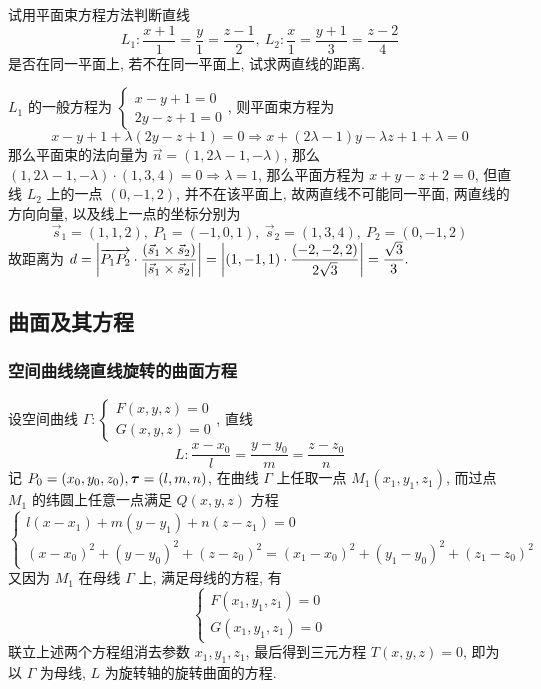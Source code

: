 \begin{example}
    试用平面束方程方法判断直线
    $$L_1:\dfrac{x+1}{1}=\dfrac{y}{1}=\dfrac{z-1}{2},~L_2:\dfrac{x}{1}=\dfrac{y+1}{3}=\dfrac{z-2}{4}$$
    是否在同一平面上, 若不在同一平面上, 试求两直线的距离.
\end{example}
\begin{solution}
    $L_1$ 的一般方程为 $\left\{\begin{matrix}
            x-y+1=0 \\
            2y-z+1=0
        \end{matrix}\right.$, 则平面束方程为 $$x-y+1+\lambda(2y-z+1)=0\Rightarrow x+(2\lambda-1)y-\lambda z+1+\lambda=0$$
    那么平面束的法向量为 $\vec{n}=(1,2\lambda-1,-\lambda)$, 那么 $(1,2\lambda-1,-\lambda)\cdot(1,3,4)=0\Rightarrow \lambda=1$, 
    那么平面方程为 $x+y-z+2=0$, 但直线 $L_2$ 上的一点 $(0,-1,2)$, 并不在该平面上, 故两直线不可能同一平面, 两直线的方向向量, 以及线上一点的坐标分别为
    $$\vec{s}_1=(1,1,2),~P_1=(-1,0,1),~\vec{s}_2=(1,3,4),~P_2=(0,-1,2)$$
    故距离为 $d=\qty|\overrightarrow{P_1P_2}\cdot\dfrac{\qty(\vec{s}_1\times\vec{s}_2)}{\qty|\vec{s}_1\times\vec{s}_2|}|=\qty|(1,-1,1)\cdot\dfrac{(-2,-2,2)}{2\sqrt{3}}|=\dfrac{\sqrt{3}}{3}.$
\end{solution}

\subsection{曲面及其方程}

\subsubsection{空间曲线绕直线旋转的曲面方程}

\begin{theorem}[空间曲线绕直线旋转的曲面方程]
    设空间曲线 $\Gamma:\begin{cases}
        F(x,y,z)=0\\
        G(x,y,z)=0
    \end{cases}$, 直线 $$L:\dfrac{x-x_0}{l}=\dfrac{y-y_0}{m}=\dfrac{z-z_0}{n}$$ 
    记 $P_0=(x_0,y_0,z_0),\vb*{\tau}=(l,m,n)$, 在曲线 $\Gamma$ 上任取一点 $M_1(x_1,y_1,z_1)$, 
    而过点 $M_1$ 的纬圆上任意一点满足 $Q(x,y,z)$ 方程
    $$
    \begin{cases}
        l(x-x_1)+m(y-y_1)+n(z-z_1)=0\\ 
        (x-x_0)^2+(y-y_0)^2+(z-z_0)^2=(x_1-x_0)^2+(y_1-y_0)^2+(z_1-z_0)^2
    \end{cases}
    $$
    又因为 $M_1$ 在母线 $\Gamma$ 上, 满足母线的方程, 有 
    $$
    \begin{cases}
        F(x_1, y_1, z_1)=0\\ 
        G(x_1, y_1, z_1)=0
    \end{cases}
    $$
    联立上述两个方程组消去参数 $x_1,y_1,z_1$, 最后得到三元方程 $T(x,y,z)=0$, 即为以 $\Gamma$ 为母线, $L$ 为旋转轴的旋转曲面的方程.
\end{theorem}

